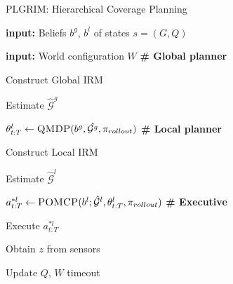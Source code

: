 \documentclass[letterpaper]{article} %
\begin{document}
\begin{algorithm}[t!]
{\fontsize{8.5pt}{9.8pt}\selectfont
\caption{PLGRIM: Hierarchical Coverage Planning}
\label{alg:PLGRIM}
\begin{algorithmic}
\STATE
\item \textbf{input: }Beliefs $b^g$, $b^l$ of states $s=(G, Q)$
\item \textbf{input: }World configuration $W$
\REPEAT
    \STATE \textbf{\# Global planner}
    \item Construct Global IRM
    \item Estimate $\hat{\mathcal{G}}^g$
    \item $\theta^l_{t:T} \gets \textsc{QMDP}(b^g, \hat{\mathcal{G}^g}, \pi_{rollout})$
    \STATE \textbf{\# Local planner}
    \item Construct Local IRM
    \item Estimate $\hat{\mathcal{G}}^l$
    \item $a_{t:T}^{*l} \gets \textsc{POMCP}(b^l;\hat{\mathcal{G}}^l, \theta^l_{t:T}, \pi_{rollout})$ 
    \STATE \textbf{\# Executive}
    \item Execute $a_{t:T}^{*l}$
    \item Obtain $z$ from sensors
    \item Update $Q$, $W$
\UNTIL timeout
\end{algorithmic}
} %
\end{algorithm}
\end{document}
